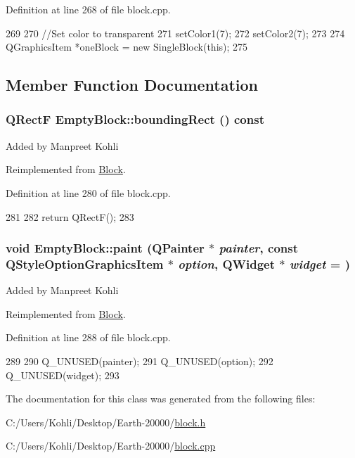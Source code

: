 Definition at line 268 of file block.cpp.


\begin{DoxyCode}
269 {
270     //Set color to transparent
271     setColor1(7);
272     setColor2(7);
273 
274     QGraphicsItem *oneBlock = new SingleBlock(this);
275 }
\end{DoxyCode}


\subsection{Member Function Documentation}
\hypertarget{class_empty_block_a1984fabb510aba7e14f460845faf881c}{
\subsubsection[{boundingRect}]{\setlength{\rightskip}{0pt plus 5cm}QRectF EmptyBlock::boundingRect () const}}
\label{class_empty_block_a1984fabb510aba7e14f460845faf881c}
Added by Manpreet Kohli 

Reimplemented from \hyperlink{class_block_aee4444b92a82f5a8080e9019ef1e554d}{Block}.

Definition at line 280 of file block.cpp.


\begin{DoxyCode}
281 {
282     return QRectF();
283 }
\end{DoxyCode}
\hypertarget{class_empty_block_a1cec09fdef31d4404857dd22151a1834}{
\subsubsection[{paint}]{\setlength{\rightskip}{0pt plus 5cm}void EmptyBlock::paint (QPainter $\ast$ {\em painter}, \/  const QStyleOptionGraphicsItem $\ast$ {\em option}, \/  QWidget $\ast$ {\em widget} = {})}}
\label{class_empty_block_a1cec09fdef31d4404857dd22151a1834}
Added by Manpreet Kohli 

Reimplemented from \hyperlink{class_block_a36791d086b6fad1a2203bfef6fdbaa0a}{Block}.

Definition at line 288 of file block.cpp.


\begin{DoxyCode}
289 {
290     Q_UNUSED(painter);
291     Q_UNUSED(option);
292     Q_UNUSED(widget);
293 }
\end{DoxyCode}


The documentation for this class was generated from the following files:\begin{DoxyCompactItemize}
\item 
C:/Users/Kohli/Desktop/Earth-\/20000/\hyperlink{block_8h}{block.h}\item 
C:/Users/Kohli/Desktop/Earth-\/20000/\hyperlink{block_8cpp}{block.cpp}\end{DoxyCompactItemize}
